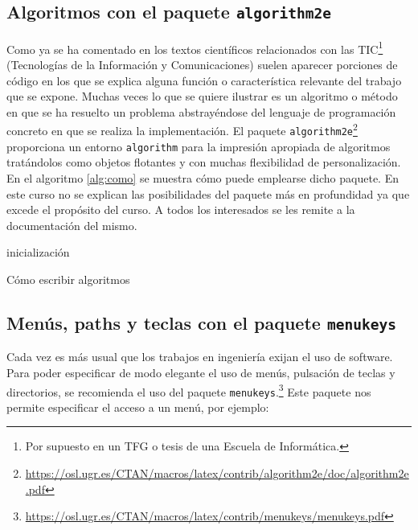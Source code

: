 \documentclass[11pt,a4paper]{article}
\begin{document}
\subsection{Algoritmos con el paquete \texttt{algorithm2e}}
Como ya se ha comentado en los textos científicos relacionados con las TIC\footnote{Por supuesto en un TFG o tesis de una Escuela de Informática.} (Tecnologías de la Información y Comunicaciones) suelen aparecer porciones de código en los que se explica alguna función o característica relevante del trabajo que se expone. Muchas veces lo que se quiere ilustrar es un algoritmo o método en que se ha resuelto un problema abstrayéndose del lenguaje de programación concreto en que se realiza la implementación. El paquete \texttt{algorithm2e}\footnote{\url{https://osl.ugr.es/CTAN/macros/latex/contrib/algorithm2e/doc/algorithm2e.pdf}} proporciona un entorno \texttt{algorithm} para la impresión apropiada de algoritmos tratándolos como objetos flotantes y con muchas flexibilidad de personalización. En el algoritmo \ref{alg:como} se muestra cómo puede emplearse dicho paquete. En este curso no se explican las posibilidades del paquete más en profundidad ya que excede el propósito del curso. A todos los interesados se les remite a la documentación del mismo.


\IncMargin{1em}
\begin{algorithm}
\LinesNumbered
\SetAlgoLined


inicialización\;

\caption{Cómo escribir algoritmos}\label{alg:como}
\end{algorithm}\DecMargin{1em}


\subsection{Menús, paths y teclas con el paquete \texttt{menukeys}}
Cada vez es más usual que los trabajos en ingeniería exijan el uso de 
software. Para poder especificar de modo elegante el uso de menús, pulsación de 
teclas y directorios, se recomienda el uso del paquete 
\texttt{menukeys}.\footnote{\url{https://osl.ugr.es/CTAN/macros/latex/contrib/menukeys/menukeys.pdf}}
  Este paquete nos permite especificar el acceso a un menú, por 
ejemplo:\\
\end{document}
